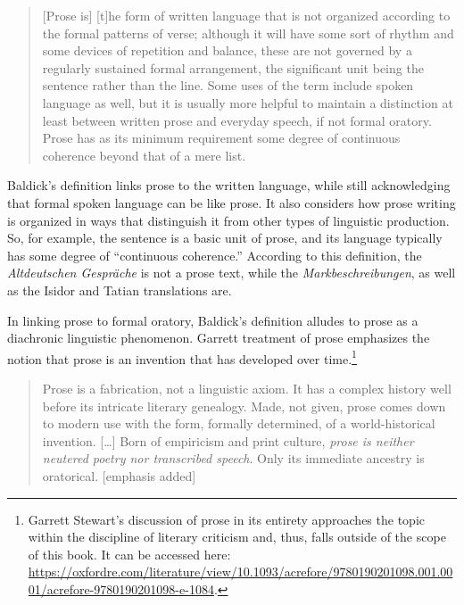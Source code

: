 \begin{quote}{}
[Prose is] [t]he form of written language that is not organized according to the formal patterns of verse; although it will have some sort of rhythm and some devices of repetition and balance, these are not governed by a regularly sustained formal arrangement, the significant unit being the sentence rather than the line. Some uses of the term include spoken language as well, but it is usually more helpful to maintain a distinction at least between written prose and everyday speech, if not formal oratory. Prose has as its minimum requirement some degree of continuous coherence beyond that of a mere list. \citep{Baldick2015}
\end{quote}

\noindent Baldick’s definition links prose to the written language, while still acknowledging that formal spoken language can be like prose. It also considers how prose writing is organized in ways that distinguish it from other types of linguistic production. So, for example, the sentence is a basic unit of prose, and its language typically has some degree of “continuous coherence.” According to this definition, the \textit{Altdeutschen Gespräche} is not a prose text, while the \textit{Markbeschreibungen}, as well as the Isidor and Tatian translations are.

In linking prose to formal oratory, Baldick’s definition alludes to prose as a diachronic linguistic phenomenon. Garrett  treatment of prose emphasizes the notion that prose is an invention that has developed over time.\footnote{{Garrett Stewart’s discussion of prose in its entirety approaches the topic within the discipline of literary criticism and, thus, falls outside of the scope of this book. It can be accessed here:} \url{https://oxfordre.com/literature/view/10.1093/acrefore/9780190201098.001.0001/acrefore-9780190201098-e-1084}. }

\begin{quote}
Prose is a fabrication, not a linguistic axiom. It has a complex history well before its intricate literary genealogy. Made, not given, prose comes down to modern use with the form, formally determined, of a world-historical invention. […] Born of empiricism and print culture, \textit{prose is neither neutered poetry nor transcribed speech}. Only its immediate ancestry is oratorical. [emphasis added]
\end{quote}

